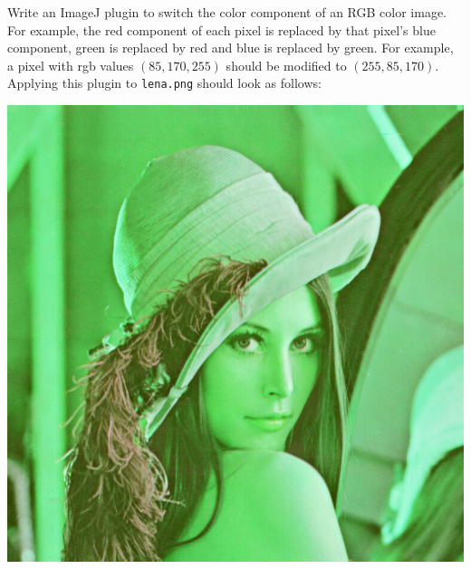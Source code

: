 \documentclass{book}
\begin{document}
\begin{exercise}
Write an ImageJ plugin to switch the color component of an RGB color image. For example, the red component of each pixel is replaced by that pixel's blue component, green is replaced by red and blue is replaced   by green. For example, a pixel with rgb values $(85, 170, 255)$ should be modified to $(255, 85, 170)$. Applying this plugin to \texttt{lena.png} should look as follows:
 
\begin{center}
\includegraphics[scale=0.2]{lena-switched.png}
\end{center}
\end{exercise}
\end{document}
